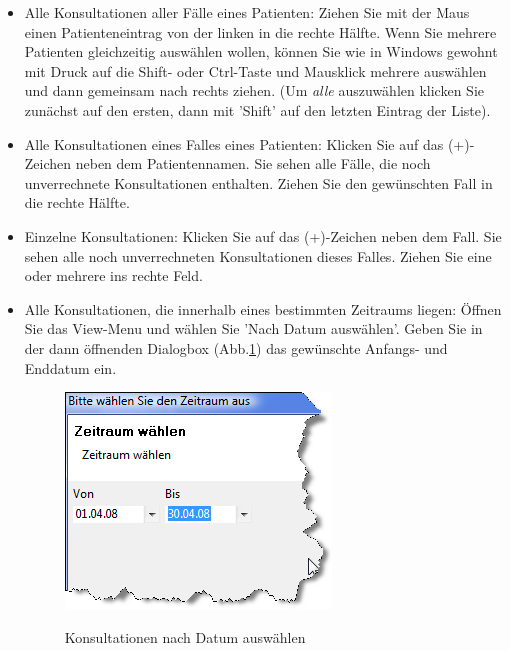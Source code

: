\documentclass[a4paper]{scrartcl}
\begin{document}
\begin{itemize}
\item Alle Konsultationen aller Fälle eines Patienten: Ziehen Sie mit der Maus einen Patienteneintrag von der linken in die rechte Hälfte. Wenn Sie mehrere Patienten gleichzeitig auswählen wollen, können Sie wie in Windows gewohnt mit Druck auf die Shift- oder Ctrl-Taste und Mausklick mehrere auswählen und dann gemeinsam nach rechts ziehen. (Um \textit{alle} auszuwählen klicken Sie zunächst auf den ersten, dann mit 'Shift' auf den letzten Eintrag der Liste).
\item Alle Konsultationen eines Falles eines Patienten: Klicken Sie auf das (+)-Zeichen neben dem Patientennamen. Sie sehen alle Fälle, die noch unverrechnete Konsultationen enthalten. Ziehen Sie den gewünschten Fall in die rechte Hälfte.
\item Einzelne Konsultationen: Klicken Sie auf das (+)-Zeichen neben dem Fall. Sie sehen alle noch unverrechneten Konsultationen dieses Falles. Ziehen Sie eine oder mehrere ins rechte Feld.
\item Alle Konsultationen, die innerhalb eines bestimmten Zeitraums liegen: Öffnen Sie das View-Menu und wählen Sie 'Nach Datum auswählen'. Geben Sie in der dann öffnenden Dialogbox (Abb.\ref{fig:abr10}) das gewünschte Anfangs- und Enddatum ein.
\begin{figure}
  \includegraphics{abr10}\\
  \caption{Konsultationen nach Datum auswählen}\label{fig:abr10}
\end{figure}
    

\end{itemize}
\end{document}
